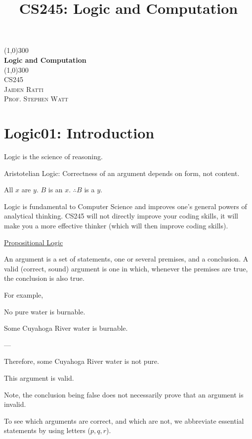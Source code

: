 \documentclass{article}
\title{CS245: Logic and Computation}
\begin{document}
\begin{titlepage}
	\begin{center}
    \line(1,0){300}\\
    [0.65cm]
	\huge{\bfseries Logic and Computation}\\
	\line(1,0){300}\\
	\textsc{\Large CS245}\\
	\textsc{\Large  Jaiden Ratti}\\
        \textsc{\Large Prof. Stephen Watt}\\
	[5.5cm]
	\end{center}
\end{titlepage}




\tableofcontents

\pagebreak

\section{Logic01: Introduction}

Logic is the science of reasoning. 

Aristotelian Logic: Correctness of an argument depends on form, not content. 

All $x$ are $y$. $B$ is an $x$. $\therefore B$ is a $y$. 

Logic is fundamental to Computer Science and improves one's general powers of analytical thinking. CS245 will not directly improve your coding skills, it will make you a more effective thinker (which will then improve coding skills). 

\underline{Propositional Logic}

An argument is a set of statements, one or several premises, and a conclusion. A valid (correct, sound) argument is one in which, whenever the premises are true, the conclusion is also true. 

For example,

No pure water is burnable. 

Some Cuyahoga River water is burnable. 

---

Therefore, some Cuyahoga River water is not pure. 

This argument is valid. 

Note, the conclusion being false does not necessarily prove that an argument is invalid. 

To see which arguments are correct, and which are not, we abbreviate essential statements by using letters ($p, q, r$). 
\end{document}
